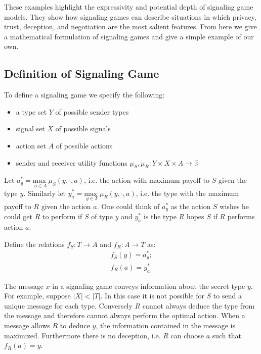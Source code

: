 \documentclass{article}
\begin{document}
These examples highlight the expressivity and potential depth of signaling game models. They show how signaling games can describe situations in which privacy, trust, deception, and negotiation are the most salient features. From here we give a mathematical formulation of signaling games and give a simple example of our own.

\subsection{Definition of Signaling Game}
To define a signaling game we specify the following:
\begin{itemize}
    \item a type set $Y$ of possible sender types
    \item signal set $X$ of possible signals
    \item action set $A$ of possible actions
    \item sender and receiver utility functions $\mu_S, \mu_R: Y \times X \times A \longrightarrow \mathbb{R}$
\end{itemize}

\noindent Let $a_y^* = \underset{a \in A}{\text{max }} \mu_S(y, \cdot, a)$, i.e. the action with maximum payoff to $S$ given the type $y$. Similarly let $y_a^* = \underset{y \in T}{\text{max }} \mu_R(y, \cdot, a)$, i.e. the type with the maximum payoff to $R$ given the action $a$. One could think of $a_y^*$ as the action $S$ wishes he could get $R$ to perform if $S$ of type $y$ and $y_a^*$ is the type $R$ hopes $S$ if $R$ performs action $a$.

Define the relations $f_S: T \rightarrow A$ and $f_R: A \rightarrow T$ as:
\begin{align*}
    f_S(y) = a_y^*;\\
    f_R(a) = y_a^*
\end{align*}

The message $x$ in a signaling game conveys information about the secret type $y$. For example, suppose $\vert X \vert < \vert T \vert$. In this case it is not possible for $S$ to send a unique message for each type. Conversely $R$ cannot always deduce the type from the message and therefore cannot always perform the optimal action. When a message allows $R$ to deduce $y$, the information contained in the message is maximized. Furthermore there is no deception, i.e. $R$ can choose $a$ such that $f_R(a) = y$.
\end{document}
